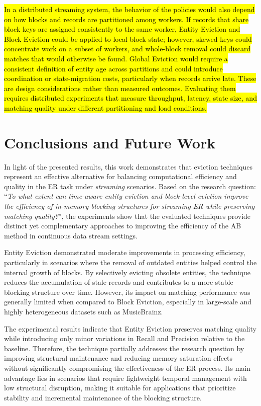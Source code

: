 \documentclass{ieeeaccess}
\begin{document}
\hl{In a distributed streaming system, the behavior of the policies would also depend on how blocks and records are partitioned among workers. If records that share block keys are assigned consistently to the same worker, Entity Eviction and Block Eviction could be applied to local block state; however, skewed keys could concentrate work on a subset of workers, and whole-block removal could discard matches that would otherwise be found. Global Eviction would require a consistent definition of entity age across partitions and could introduce coordination or state-migration costs, particularly when records arrive late. These are design considerations rather than measured outcomes. Evaluating them requires distributed experiments that measure throughput, latency, state size, and matching quality under different partitioning and load conditions.}

\section{Conclusions and Future Work} \label{sec:conclusao}

In light of the presented results, this work demonstrates that eviction techniques represent an effective alternative for balancing computational efficiency and quality in the ER task under \textit{streaming} scenarios. Based on the research question: ``\textit{To what extent can time-aware entity eviction and block-level eviction improve the efficiency of in-memory blocking structures for streaming ER while preserving matching quality?}'', the experiments show that the evaluated techniques provide distinct yet complementary approaches to improving the efficiency of the AB method \cite{10.1109/TKDE.2024.3361022} in continuous data stream settings.

Entity Eviction demonstrated moderate improvements in processing efficiency, particularly in scenarios where the removal of outdated entities helped control the internal growth of blocks. By selectively evicting obsolete entities, the technique reduces the accumulation of stale records and contributes to a more stable blocking structure over time. However, its impact on matching performance was generally limited when compared to Block Eviction, especially in large-scale and highly heterogeneous datasets such as MusicBrainz.

The experimental results indicate that Entity Eviction preserves matching quality while introducing only minor variations in Recall and Precision relative to the baseline. Therefore, the technique partially addresses the research question by improving structural maintenance and reducing memory saturation effects without significantly compromising the effectiveness of the ER process. Its main advantage lies in scenarios that require lightweight temporal management with low structural disruption, making it suitable for applications that prioritize stability and incremental maintenance of the blocking structure.
\end{document}
